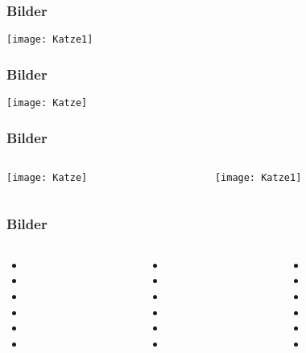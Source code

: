 \documentclass{beamer}
\begin{document}
\begin{frame}
\frametitle{Bilder}

\texttt{[image: Katze1]}


\end{frame}

\begin{frame}
\frametitle{Bilder}

\texttt{[image: Katze]}

\end{frame}

\begin{frame}
\frametitle{Bilder}

\begin{columns}
\begin{column}{0.5\textwidth}
\texttt{[image: Katze]}
\end{column}
\begin{column}{0.5\textwidth}
\texttt{[image: Katze1]}
\end{column}
\end{columns}

\end{frame}

\begin{frame}
\frametitle{Bilder}

\begin{columns}
\begin{column}{0.33\textwidth}
\begin{itemize}
	\item 
	\item 
	\item 
	\item 
	\item 
	\item 
	\end{itemize}
\end{column}
\begin{column}{0.33\textwidth}
\begin{itemize}
	\item 
	\item 
	\item 
	\item 
	\item 
	\item 
	\end{itemize}
\end{column}
\begin{column}{0.33\textwidth}
\begin{itemize}
	\item 
	\item 
	\item 
	\item 
	\item 
	\item 
	\end{itemize}
\end{column}
\end{columns}
\end{frame}
\end{document}
